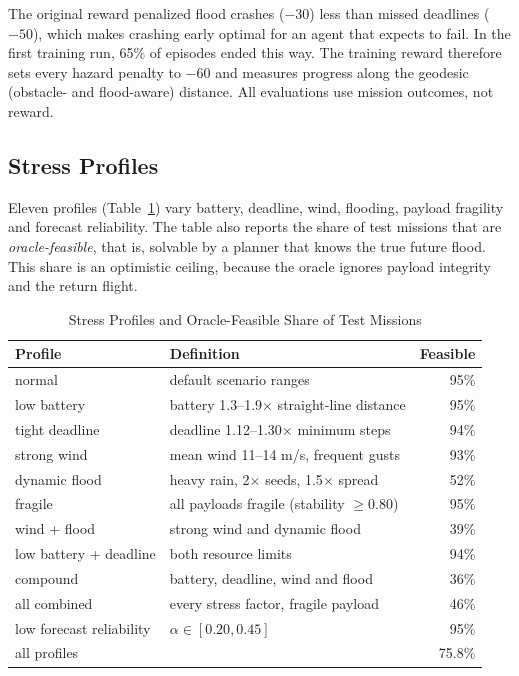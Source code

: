 \documentclass{ieeeaccess}
\begin{document}
The original reward penalized flood crashes ($-30$) less than missed deadlines ($-50$), which makes crashing early optimal for an agent that expects to fail. In the first training run, 65\% of episodes ended this way. The training reward therefore sets every hazard penalty to $-60$ and measures progress along the geodesic (obstacle- and flood-aware) distance. All evaluations use mission outcomes, not reward.

\subsection{Stress Profiles}
Eleven profiles (Table~\ref{tab:profiles}) vary battery, deadline, wind, flooding, payload fragility and forecast reliability. The table also reports the share of test missions that are \emph{oracle-feasible}, that is, solvable by a planner that knows the true future flood. This share is an optimistic ceiling, because the oracle ignores payload integrity and the return flight.

\begin{table}[t]
\caption{Stress Profiles and Oracle-Feasible Share of Test Missions}
\label{tab:profiles}
\setlength{\tabcolsep}{3pt}
\begin{tabular}{@{}p{78pt}p{126pt}r@{}}
\toprule
Profile & Definition & Feasible \\
\midrule
normal & default scenario ranges & 95\% \\
low battery & battery 1.3--1.9$\times$ straight-line distance & 95\% \\
tight deadline & deadline 1.12--1.30$\times$ minimum steps & 94\% \\
strong wind & mean wind 11--14 m/s, frequent gusts & 93\% \\
dynamic flood & heavy rain, 2$\times$ seeds, 1.5$\times$ spread & 52\% \\
fragile & all payloads fragile (stability $\ge0.80$) & 95\% \\
wind + flood & strong wind and dynamic flood & 39\% \\
low battery + deadline & both resource limits & 94\% \\
compound & battery, deadline, wind and flood & 36\% \\
all combined & every stress factor, fragile payload & 46\% \\
low forecast reliability & $\alpha\in[0.20,0.45]$ & 95\% \\
\midrule
all profiles & & 75.8\% \\
\bottomrule
\end{tabular}
\end{table}
\end{document}
